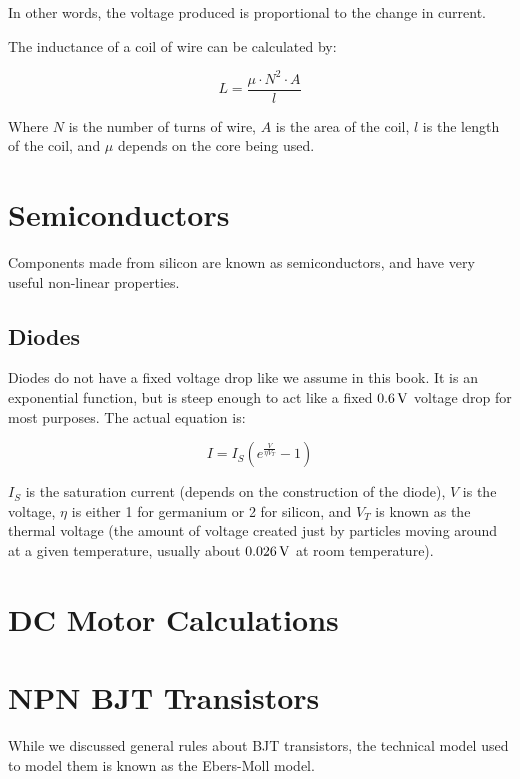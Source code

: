 In other words, the voltage produced is proportional to the change in current.

The inductance of a coil of wire can be calculated by:

\begin{equation}
L = \frac{\mu \cdot N^2 \cdot A}{l}
\end{equation}

Where $N$ is the number of turns of wire, $A$ is the area of the coil, $l$ is the length of the coil, and $\mu$ depends on the core being used.

\section{Semiconductors}

Components made from silicon are known as semiconductors, and have very useful non-linear properties.

\subsection{Diodes}

Diodes do not have a fixed voltage drop like we assume in this book.  
It is an exponential function, but is steep enough to act like a fixed $0.6\,\si{\volt}$ voltage drop for most purposes.
The actual equation is:

\begin{equation}
I = I_S (e^{\frac{V}{\eta V_T}} - 1)
\end{equation}

$I_S$ is the saturation current (depends on the construction of the diode), $V$ is the voltage, $\eta$ is either 1 for germanium or 2 for silicon, and $V_T$ is known as the thermal voltage (the amount of voltage created just by particles moving around at a given temperature, usually about $0.026\,\si{\volt}$ at room temperature).

\section{DC Motor Calculations}
\label{appDCMotorCalculations}


\section{NPN BJT Transistors}

While we discussed general rules about BJT transistors, the technical model used to model them is known as the Ebers-Moll model.

